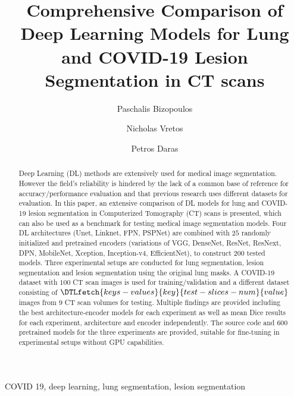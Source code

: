 \documentclass{elsarticle}
\begin{document}

\title{Comprehensive Comparison of Deep Learning Models for Lung and COVID-19 Lesion Segmentation in CT scans}
\author[1]{Paschalis Bizopoulos}
\author[1]{Nicholas Vretos}
\author[1]{Petros Daras}

\address[1]{Visual Computing Lab of the Information Technologies Institute, Centre for Research and Technology Hellas, Thessaloniki, Greece e-mail: pbizopoulos@protonmail.com,\{vretos,daras\}@iti.gr}

\begin{abstract}
	Deep Learning (DL) methods are extensively used for medical image segmentation.
	However the field's reliability is hindered by the lack of a common base of reference for accuracy/performance evaluation and that previous research uses different datasets for evaluation.
	In this paper, an extensive comparison of DL models for lung and COVID-19 lesion segmentation in Computerized Tomography (CT) scans is presented, which can also be used as a benchmark for testing medical image segmentation models.
	Four DL architectures (Unet, Linknet, FPN, PSPNet) are combined with $25$ randomly initialized and pretrained encoders (variations of VGG, DenseNet, ResNet, ResNext, DPN, MobileNet, Xception, Inception-v4, EfficientNet), to construct $200$ tested models.
	Three experimental setups are conducted for lung segmentation, lesion segmentation and lesion segmentation using the original lung masks.
	A COVID-19 dataset with $100$ CT scan images is used for training/validation and a different dataset consisting of $\DTLfetch{keys-values}{key}{test-slices-num}{value}$ images from $9$ CT scan volumes for testing.
	Multiple findings are provided including the best architecture-encoder models for each experiment as well as mean Dice results for each experiment, architecture and encoder independently.
	The source code and $600$ pretrained models for the three experiments are provided, suitable for fine-tuning in experimental setups without GPU capabilities.
\end{abstract}

\begin{keyword}
	COVID 19, deep learning, lung segmentation, lesion segmentation
\end{keyword}

\maketitle
\end{document}

